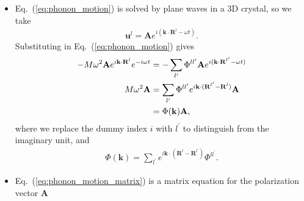 \documentclass{beamer}
\newcommand*\vf[1]{\mathbf{#1}}
\begin{document}
\begin{frame}{}
\begin{itemize}
\item Eq.~(\ref{eq:phonon_motion}) is solved by plane waves in a 3D crystal, so we take
\begin{align}
\vf{u}^l = \vf{A} e^{i (\vf{k} \cdot \vf{R}^l - \omega t)}.
\end{align}
Substituting in Eq.~(\ref{eq:phonon_motion}) gives
\begin{align}
-M \omega^2 \vf{A} e^{i \vf{k} \cdot \vf{R}^l} e^{- i \omega t} &= -\sum_{l^{\prime}} \Phi^{l l^{\prime}} \vf{A} e^{i(\vf{k} \cdot \vf{R}^{l^{\prime}} - \omega t)} \\
M \omega^2 \vf{A} &= \sum_{l^{\prime}} \Phi^{l l^{\prime}} e^{i \vf{k} \cdot (\vf{R}^{l^{\prime}} - \vf{R}^l)} \vf{A} \notag \\
&= \Phi(\vf{k}) \vf{A}, \label{eq:phonon_motion_matrix}
\end{align}
where we replace the dummy index $i$ with $l^{\prime}$ to distinguish from the imaginary unit, and
\begin{align}
\Phi(\vf{k}) = \sum_{l^{\prime}} e^{i \vf{k} \cdot (\vf{R}^l - \vf{R}^{l^{\prime}})} \Phi^{l l^{\prime}}. \label{eq:dyn_matrix}
\end{align}
\item Eq.~(\ref{eq:phonon_motion_matrix}) is a matrix equation for the polarization vector $\vf{A}$
\end{itemize}
\end{frame}

\end{document}
